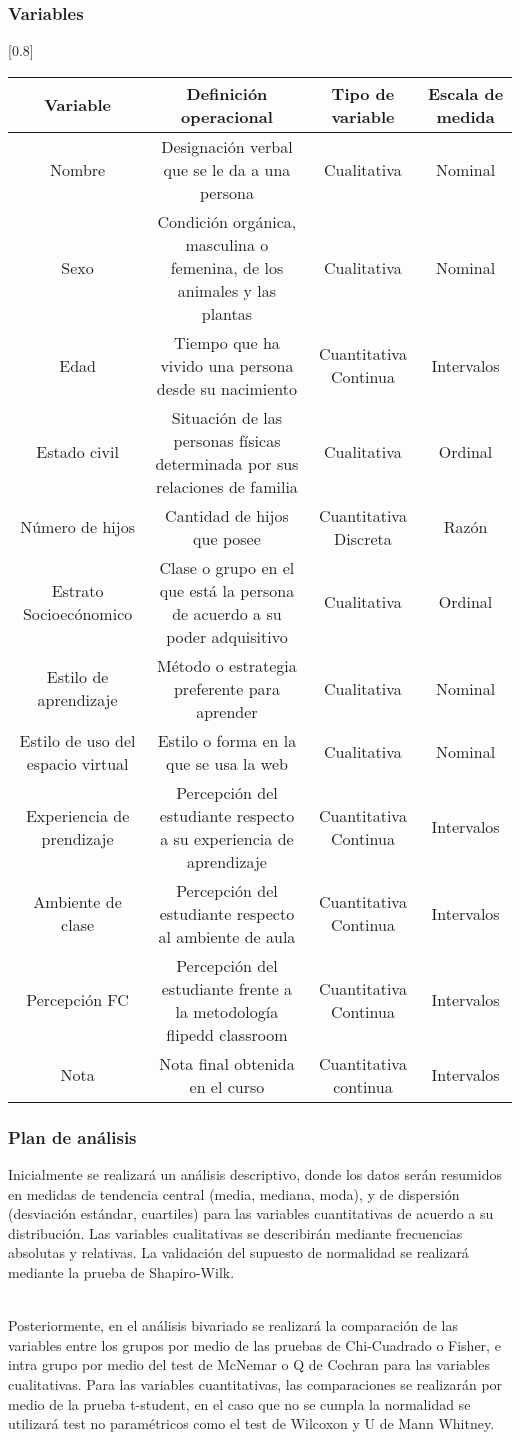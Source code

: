 \documentclass[12pt]{beamer}
\begin{document}
\begin{frame}
\frametitle{Variables}
\scalebox{0.45}[0.8]{
\begin{tabular}{|c|c|c|c|}
\hline 
Variable & Definición operacional & Tipo de variable & Escala de medida \\ 
\hline 
Nombre & Designación verbal que se le da a una persona & Cualitativa & Nominal \\ 
Sexo & Condición orgánica, masculina o femenina, de los animales y las plantas & Cualitativa & Nominal \\ 
Edad & Tiempo que ha vivido una persona desde su nacimiento & Cuantitativa Continua & Intervalos \\ 
Estado civil & Situación de las personas físicas determinada por sus relaciones de familia & Cualitativa & Ordinal \\ 
Número de hijos & Cantidad de hijos que posee & Cuantitativa Discreta & Razón \\ 
Estrato Socioecónomico & Clase o grupo en el que está la persona de acuerdo a su poder adquisitivo & Cualitativa & Ordinal \\ 
Estilo de aprendizaje & Método o estrategia preferente para aprender & Cualitativa & Nominal \\ 
Estilo de uso del espacio virtual & Estilo o forma en la que se usa la web & Cualitativa & Nominal \\ 
Experiencia de prendizaje & Percepción del estudiante respecto a su experiencia de aprendizaje  & Cuantitativa Continua & Intervalos \\ 
Ambiente de clase & Percepción del estudiante respecto al ambiente de aula & Cuantitativa Continua & Intervalos \\ 
Percepción FC & Percepción del estudiante frente a la metodología flipedd classroom & Cuantitativa Continua & Intervalos \\
Nota & Nota final obtenida en el curso & Cuantitativa continua & Intervalos \\ 
\hline 
\end{tabular} 
}
\end{frame}

\begin{frame}
\frametitle{Plan de análisis}
Inicialmente se realizará un análisis descriptivo, donde los datos serán resumidos en medidas de tendencia central (media, mediana, moda), y de dispersión (desviación estándar, cuartiles) para las variables cuantitativas de acuerdo a su distribución. Las variables cualitativas se describirán mediante frecuencias absolutas y relativas. La validación del supuesto de normalidad se realizará mediante la prueba de Shapiro-Wilk.

~\\Posteriormente, en el análisis bivariado se realizará la comparación de las variables entre los grupos por medio de las pruebas de Chi-Cuadrado o Fisher, e intra grupo por medio del test de McNemar o Q de Cochran para las variables cualitativas. Para las variables cuantitativas, las comparaciones se realizarán por medio de la prueba t-student, en el caso que no se cumpla la normalidad se utilizará test no paramétricos como el test de Wilcoxon y U de Mann Whitney.
\end{frame}
\end{document}

